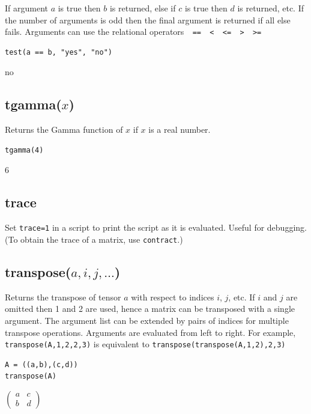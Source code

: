 If argument $a$ is true then $b$ is returned, else if $c$ is true then $d$ is returned, etc.
If the number of arguments is odd then the final argument is returned if all else fails.
Arguments can use the relational operators\verb$  ==  <  <=  >  >=$

{\color{blue}
\begin{verbatim}
test(a == b, "yes", "no")
\end{verbatim}
}

no

\subsection*{tgamma($x$)}

Returns the Gamma function of $x$ if $x$ is a real number.

{\color{blue}
\begin{verbatim}
tgamma(4)
\end{verbatim}
}

$6$

\subsection*{trace}

Set \verb$trace=1$ in a script to print the script as it is evaluated.
Useful for debugging.
(To obtain the trace of a matrix, use \verb$contract$.)

\subsection*{transpose($a,i,j,\ldots$)}

Returns the transpose of tensor $a$ with respect to indices $i$, $j$, etc.
If $i$ and $j$ are omitted then 1 and 2 are used,
hence a matrix can be transposed with a single argument.
The argument list can be extended by pairs of indices for multiple transpose operations.
Arguments are evaluated from left to right.
For example,
\verb$transpose(A,1,2,2,3)$
is equivalent to
\verb$transpose(transpose(A,1,2),2,3)$

{\color{blue}
\begin{verbatim}
A = ((a,b),(c,d))
transpose(A)
\end{verbatim}
}

$\displaystyle
\begin{pmatrix}
a & c
\\[1ex]
b & d
\end{pmatrix}
$

